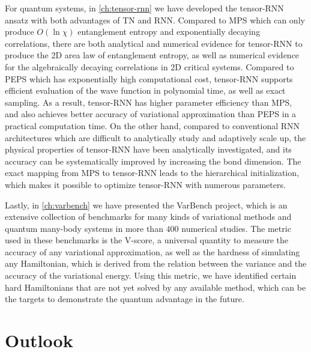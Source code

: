 For quantum systems, in \cref{ch:tensor-rnn} we have developed the tensor-RNN ansatz with both advantages of TN and RNN. Compared to MPS which can only produce $O(\ln \chi)$ entanglement entropy and exponentially decaying correlations, there are both analytical and numerical evidence for tensor-RNN to produce the 2D area law of entanglement entropy, as well as numerical evidence for the algebraically decaying correlations in 2D critical systems. Compared to PEPS which has exponentially high computational cost, tensor-RNN supports efficient evaluation of the wave function in polynomial time, as well as exact sampling. As a result, tensor-RNN has higher parameter efficiency than MPS, and also achieves better accuracy of variational approximation than PEPS in a practical computation time. On the other hand, compared to conventional RNN architectures which are difficult to analytically study and adaptively scale up, the physical properties of tensor-RNN have been analytically investigated, and its accuracy can be systematically improved by increasing the bond dimension. The exact mapping from MPS to tensor-RNN leads to the hierarchical initialization, which makes it possible to optimize tensor-RNN with numerous parameters.

Lastly, in \cref{ch:varbench} we have presented the VarBench project, which is an extensive collection of benchmarks for many kinds of variational methods and quantum many-body systems in more than $400$ numerical studies. The metric used in these benchmarks is the V-score, a universal quantity to measure the accuracy of any variational approximation, as well as the hardness of simulating any Hamiltonian, which is derived from the relation between the variance and the accuracy of the variational energy. Using this metric, we have identified certain hard Hamiltonians that are not yet solved by any available method, which can be the targets to demonstrate the quantum advantage in the future.

\section{Outlook}

